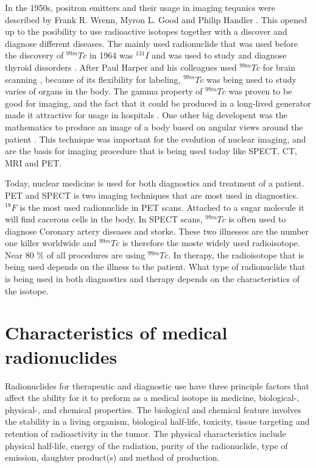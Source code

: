\documentclass[twoside,english]{uiofysmaster/uiofysmaster}
\begin{document}
In the 1950s,  positron emitters and their usage in imaging tequnics were described by Frank R. Wrenn, Myron L. Good and Philip Handler \cite{Wrenn1951}. This opened up to the posibility to use radioactive isotopes together with a discover and diagnose different diseases. The mainly used radionuclide that was used before the discovery of $^{99m}Tc$ in 1964 \cite{harper_tc99m} was $^{131}I$ and was used to study and diagnose thyroid dissorders \cite{Cherry2012_chap1}. After Paul Harper and his colleagues used $^{99m}Tc$ for brain scanning \cite{harper_tc99m},  because of its flexibility for labeling, $^{99m}Tc$ was being used to study varies of organs in the body. The gamma property of $^{99m}Tc$ was proven to be good for imaging, and the fact that it could be produced in a long-lived generator made it attractive for usage in hospitals \cite{harper_tc99m}. One other big developent was the mathematics to produce an image of a body based on angular views around the patient \cite{Cherry2012_chap1}. This technique was important for the evolution of nuclear imaging, and are the basis for imaging procedure that is being used today like SPECT, CT, MRI and PET.


Today, nuclear medicine is used for both diagnostics and treatment of a patient. PET and SPECT is two imaging techniques that are most used in diagnostics. $^{18}F$ is the most used radionuclide in PET scans. Attached to a sugar molecule it will find cacerous cells in the body. In SPECT scans, $^{99m}Tc$ is often used to diagnose Coronary artery diseases and storke. These two illnesses are the number one killer worldwide and $^{99m}Tc$ is therefore the moste widely used radioisotope. Near 80 $\%$ of all procedures are using $^{99m}Tc$. In therapy, the radioisotope that is being used depends on the illness to the patient. What type of radionuclide that is being used in both diagnostics and therapy depends on the characteristics of the isotope.   



\section{Characteristics of medical radionuclides}
\noindent

Radionuclides for therapeutic and diagnostic use have three principle factors that affect the ability for it to preform as a medical isotope in medicine\cite{invivo}, biological-, physical-, and chemical properties.
The biological and chemical feature involves the stability in a living organism, biological half-life, toxicity, tissue targeting and retention of radioactivity in the tumor\cite{Yeong}.
The physical characteristics include physical half-life, energy of the radiation, purity of the radionuclide, type of emission, daughter product(s) and method of production\cite{Yeong}. 
\end{document}
